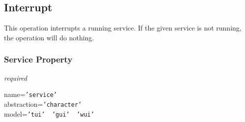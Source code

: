 %
%
%
%
%
%

\subsection{Interrupt}
\label{interrupt_heading}

This operation interrupts a running service. If the given service is not
running, the operation will do nothing.

\subsubsection{Service Property}

\emph{required}

name=\texttt{'service'}\\
abstraction=\texttt{'character'}\\
model=\texttt{'tui' \vline\ 'gui' \vline\ 'wui'}
